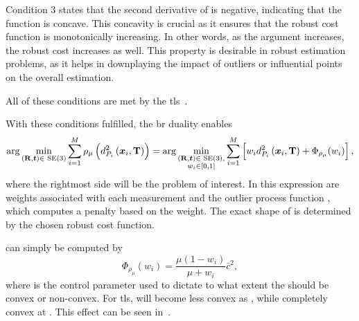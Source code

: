 Condition 3 states that the second derivative of  is negative, indicating that the function  is concave. This concavity is crucial as it ensures that the robust cost function \mvar{\rho(\cdot)} is monotonically increasing. In other words, as the argument  increases, the robust cost increases as well. This property is desirable in robust estimation problems, as it helps in downplaying the impact of outliers or influential points on the overall estimation. \medskip

All of these conditions are met by the \gls{tls}~\cite{graduated-non-convexity-for-robust-spatial-perception:-from-non-minimal-solvers-to-global-outlier-rejection}.\medskip

With these conditions fulfilled, the \gls{br} duality enables
%
\begin{equation}\label{eq:br-result}
	\arg \min_{(\bm{\mathrm{R}},\bm{t})\in\text{ SE} (3)} \sum^M_{i=1} \rho_\mu \left(d_{P_i}^2\left( \bm{x}_i,\bm{\mathrm{T}} \right)\right) = 
	\arg \min_{\substack{(\bm{\mathrm{R}},\bm{t})\in\text{ SE} (3),\\ w_i\in [0,1]}} \sum^M_{i=1} \left[ w_i d_{P_i}^2\left( \bm{x}_i,\bm{\mathrm{T}} \right) + \Phi_{\rho_\mu}(w_i)\right],
\end{equation}
where the rightmost side will be the problem of interest. In this expression  are weights associated with each measurement  and the outlier process function , which computes a penalty based on the weight. The exact shape of  is determined by the chosen robust cost function. \medskip

 can simply be computed by
%
\begin{equation}
	\Phi_{\rho_\mu}(w_i) = \frac{\mu(1-w_i)}{\mu+w_i}\bar{c}^2,
\end{equation}
where \mvar{\mu} is the control parameter used to dictate to what extent the  should be convex or non-convex. For \gls{tls},  will become less convex as \mvar{\mu\rightarrow \infty}, while completely convex at . This effect can be seen in~.

